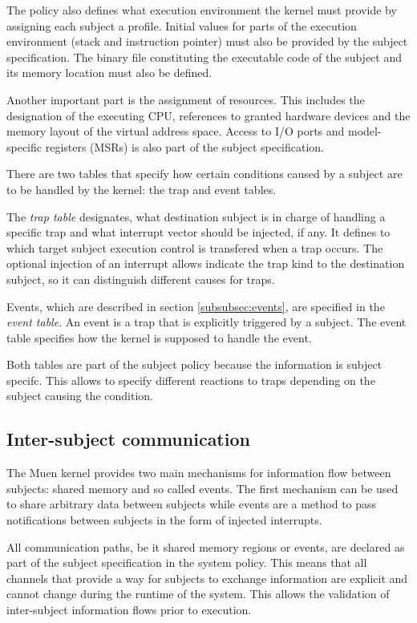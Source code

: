 The policy also defines what execution environment the kernel must provide by
assigning each subject a profile. Initial values for parts of the execution
environment (stack and instruction pointer) must also be provided by the subject
specification. The binary file constituting the executable code of the subject
and its memory location must also be defined.

Another important part is the assignment of resources. This includes the
designation of the executing CPU, references to granted hardware devices and the
memory layout of the virtual address space. Access to I/O ports and
model-specific registers (MSRs) is also part of the subject specification.

There are two tables that specify how certain conditions caused by a subject
are to be handled by the kernel: the trap and event tables.

The \emph{trap table} designates, what destination subject is in charge of
handling a specific trap and what interrupt vector should be injected, if any.
It defines to which target subject execution control is transfered when a trap
occurs. The optional injection of an interrupt allows indicate the trap kind
to the destination subject, so it can distinguish different causes for traps.

Events, which are described in section \ref{subsubsec:events}, are specified in
the \emph{event table}. An event is a trap that is explicitly triggered by a
subject. The event table specifies how the kernel is supposed to handle the
event.

Both tables are part of the subject policy because the information is subject
specifc. This allows to specify different reactions to traps depending on the
subject causing the condition.

\subsection{Inter-subject communication}
The Muen kernel provides two main mechanisms for information flow between
subjects: shared memory and so called events. The first mechanism can be used
to share arbitrary data between subjects while events are a method to pass
notifications between subjects in the form of injected interrupts.

All communication paths, be it shared memory regions or events, are declared as
part of the subject specification in the system policy. This means that all
channels that provide a way for subjects to exchange information are explicit
and cannot change during the runtime of the system. This allows the validation
of inter-subject information flows prior to execution.


